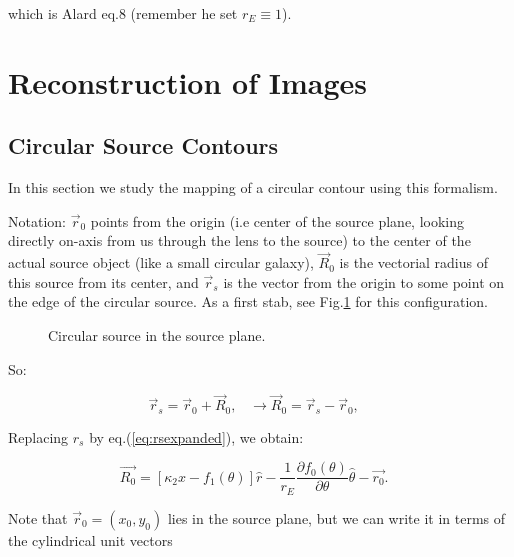 \documentclass{article}
\def\be{\begin{equation}}
\def\ee{\end{equation}}
\def\eqref{eq.(\ref}
\def\figref{Fig.\ref}
\def\rar{\rightarrow}
\begin{document}
which is Alard eq.8 (remember he set $r_E \equiv 1$).


\section{Reconstruction of Images}


\subsection{Circular Source Contours}

In this section we study the mapping of a circular contour using this formalism.

Notation: $ \vec{r}_{0}$ points from the origin (i.e center of the
source plane, looking directly on-axis from us through the lens to the
source) to the center of the actual source object (like a small
circular galaxy), $ \vec{R}_{0}$ is the vectorial radius of this
source from its center, and $ \vec{r}_{s}$ is the vector from the
origin to some point on the edge of the circular source. As a first
stab, see \figref{fig:sourceplane} for this configuration.



\begin{figure}
\begin{center}
\caption{\label{fig:sourceplane} Circular source in the source plane.}
\end{center}
\end{figure}

So:

\be
\vec{r}_s =  \vec{r}_{0} + \vec{R}_{0} , \;\;\; \rar \vec{R}_{0} = \vec{r}_s - \vec{r}_{0}, \;\;\; 
\ee


Replacing $r_s$ by \eqref{eq:rsexpanded}), we obtain:

\be
\label{eq:Rzero}
\vec{R_{0}} = \left[ \kappa_2 x - f_{1}(\theta) \right]\hat{r} - \frac{1}{r_E} \frac{\partial f_0(\theta)}{\partial \theta} \hat{\theta} - \vec{r_{0}}. \;\;\; 
\ee


Note that $\vec{r}_{0} = (x_0,y_0)$ lies in the source plane, but we
can write it in terms of the cylindrical unit vectors 
\end{document}
